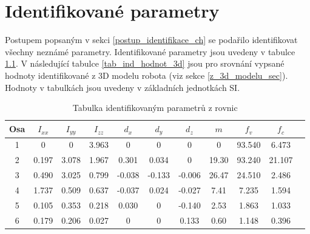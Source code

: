 

\chapter{Identifikované parametry}

Postupem popsaným v sekci \ref{postup_identifikace_ch} se podařilo identifikovat všechny neznámé parametry. Identifikované parametry jsou uvedeny v tabulce \ref{tab_ind_hodnot}. V následující tabulce \ref{tab_ind_hodnot_3d} jsou pro srovnání vypsané hodnoty identifikované z 3D modelu robota (viz sekce \ref{z_3d_modelu_sec}). Hodnoty v tabulkách jsou uvedeny v základních jednotkách SI. 
\\
\begin{table}[htbp]
  \centering
  \caption{Tabulka identifikovaným parametrů z rovnic}
    \begin{tabular}{c|cccccccccc}
    \multicolumn{1}{c|}{Osa} & \multicolumn{1}{c}{$I_{xx}$} & \multicolumn{1}{c}{$I_{yy}$} & \multicolumn{1}{c}{$I_{zz}$} & \multicolumn{1}{c}{$d_x$} & \multicolumn{1}{c}{$d_y$} & \multicolumn{1}{c}{$d_z$} & \multicolumn{1}{c}{$m$} & \multicolumn{1}{c}{$f_v$} & \multicolumn{1}{c}{$f_c$} \\
    \hline
    1  & 0     & 0     & 3.963 & 0     & 0     & 0     & 0     & 93.540 &  6.473 \\
    2  & 0.197 & 3.078 & 1.967 & 0.301 & 0.034 & 0     & 19.30 & 93.240 & 21.107 \\
    3  & 0.490 & 3.025 & 0.799 &-0.038 &-0.133 &-0.006 & 26.47 & 24.510 &  2.486 \\
    4  & 1.737 & 0.509 & 0.637 &-0.037 & 0.024 &-0.027 & 7.41  &  7.235 &  1.594 \\
    5  & 0.105 & 0.353 & 0.218 & 0.030 & 0     &-0.140 & 2.53  &  1.863 &  1.033 \\
    6  & 0.179 & 0.206 & 0.027 & 0     & 0     & 0.133 & 0.60  &  1.148 &  0.396 \\
    \end{tabular}%
  \label{tab_ind_hodnot}%
\end{table}%

